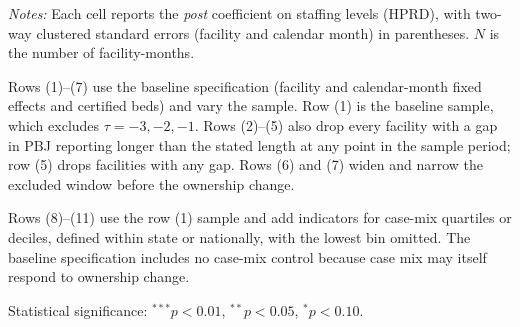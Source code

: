 \begin{table}[!ht]
\begin{threeparttable}
\begin{tablenotes}[flushleft]
\footnotesize
\item \textit{Notes:} Each cell reports the \textit{post} coefficient on staffing levels (HPRD), with two-way clustered standard errors (facility and calendar month) in parentheses. $N$ is the number of facility-months.
\item Rows (1)--(7) use the baseline specification (facility and calendar-month fixed effects and certified beds) and vary the sample. Row (1) is the baseline sample, which excludes $\tau = -3, -2, -1$. Rows (2)--(5) also drop every facility with a gap in PBJ reporting longer than the stated length at any point in the sample period; row (5) drops facilities with any gap. Rows (6) and (7) widen and narrow the excluded window before the ownership change.
\item Rows (8)--(11) use the row (1) sample and add indicators for case-mix quartiles or deciles, defined within state or nationally, with the lowest bin omitted. The baseline specification includes no case-mix control because case mix may itself respond to ownership change.
\item Statistical significance: $^{***}p<0.01$, $^{**}p<0.05$, $^{*}p<0.10$.
\end{tablenotes}

\end{threeparttable}
\end{table}
\endgroup

